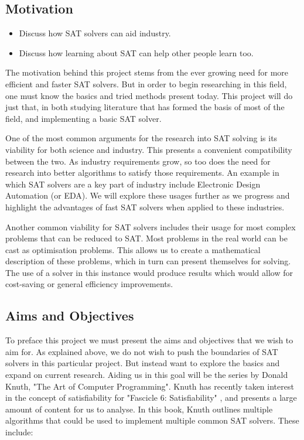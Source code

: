 \documentclass{article}
\begin{document}
\subsection{Motivation}
\begin{itemize}
    \item Discuss how SAT solvers can aid industry.
    \item Discuss how learning about SAT can help other people learn too.
\end{itemize}

The motivation behind this project stems from the ever growing need for more efficient and faster SAT solvers. But in order to begin researching in this field, one must know the basics and tried methods present today. This project will do just that, in both studying literature that has formed the basis of most of the field, and implementing a basic SAT solver.

One of the most common arguments for the research into SAT solving is its viability for both science and industry. This presents a convenient compatibility between the two. As industry requirements grow, so too does the need for research into better algorithms to satisfy those requirements. An example in which SAT solvers are a key part of industry include Electronic Design Automation (or EDA). We will explore these usages further as we progress and highlight the advantages of fast SAT solvers when applied to these industries.

Another common viability for SAT solvers includes their usage for most complex problems that can be reduced to SAT. Most problems in the real world can be cast as optimisation problems. This allows us to create a mathematical description of these problems, which in turn can present themselves for solving. The use of a solver in this instance would produce results which would allow for cost-saving or general efficiency improvements.

\subsection{Aims and Objectives}
To preface this project we must present the aims and objectives that we wish to aim for. As explained above, we do not wish to push the boundaries of SAT solvers in this particular project. But instead want to explore the basics and expand on current research. Aiding us in this goal will be the series by Donald Knuth, "The Art of Computer Programming". Knuth has recently taken interest in the concept of satisfiability for "Fascicle 6: Satisfiability" , and presents a large amount of content for us to analyse. In this book, Knuth outlines multiple algorithms that could be used to implement multiple common SAT solvers. These include:
\end{document}
